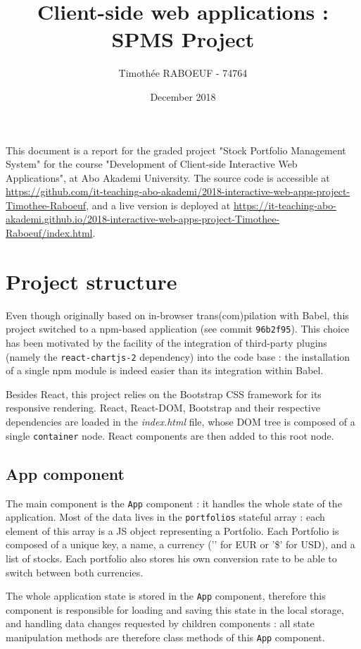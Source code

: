 \documentclass{article}
\title{Client-side web applications : SPMS Project}
\author{Timothée RABOEUF - 74764}
\date{December 2018}
\begin{document}
    \maketitle

    This document is a report for the graded project "Stock Portfolio Management System" for the course "Development of Client-side Interactive Web Applications", at Abo Akademi University. The source code is accessible at \url{https://github.com/it-teaching-abo-akademi/2018-interactive-web-apps-project-Timothee-Raboeuf}, and a live version is deployed at \url{https://it-teaching-abo-akademi.github.io/2018-interactive-web-apps-project-Timothee-Raboeuf/index.html}.

    \section*{Project structure}

    Even though originally based on in-browser trans(com)pilation with Babel, this project switched to a npm-based application (see commit \texttt{96b2f95}). This choice has been motivated by the facility of the integration of third-party plugins (namely the \texttt{react-chartjs-2} dependency) into the code base : the installation of a single npm module is indeed easier than its integration within Babel. 

    Besides React, this project relies on the Bootstrap CSS framework for its responsive rendering. React, React-DOM, Bootstrap and their respective dependencies are loaded in the \textit{index.html} file, whose DOM tree is composed of a single \texttt{container} node. React components are then added to this root node. 
    
    \subsection*{App component}
    
    The main component is the \texttt{App} component : it handles the whole state of the application. Most of the data lives in the \texttt{portfolios} stateful array : each element of this array is a JS object representing a Portfolio. Each Portfolio is composed of a unique key, a name, a currency ('\texteuro' for EUR or '\$' for USD), and a list of stocks. Each portfolio also stores his own conversion rate to be able to switch between both currencies. 
    
    The whole application state is stored in the \texttt{App} component, therefore this component is responsible for loading and saving this state in the local storage, and handling data changes requested by children components : all state manipulation methods are therefore class methods of this \texttt{App} component. 
    
\end{document}
